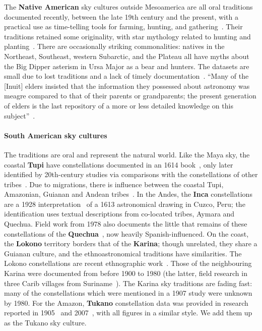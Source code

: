 \documentclass[10pt]{article}
\begin{document}
The {\bf Native American} sky cultures outside Mesoamerica are all oral traditions documented recently, between the late 19th century and the present, with a practical use as time-telling tools for farming, hunting, and gathering~\cite{krupp2013namerica}. Their traditions retained some originality, with star mythology related to hunting and planting~\cite{miller1997stars}. There are occasionally striking commonalities: natives in the Northeast, Southeast, western Subarctic, and the Plateau all have myths about the Big Dipper asterism in Ursa Major as a bear and hunters. The datasets are small due to lost traditions and a lack of timely documentation~\cite{miller1997stars}. ``Many of the [Inuit] elders insisted that the information they possessed about astronomy was meagre compared to that of their parents or grandparents; the present generation of elders is the last repository of a more or less detailed knowledge on this subject''~\cite{macdonald1998arctic}.

\paragraph{South American sky cultures} The traditions are oral and represent the natural world. Like the Maya sky, the coastal {\bf Tupi} have constellations documented in an 1614 book~\cite{abbeville1614histoire}, only later identified by 20th-century studies via comparisons with the constellations of other tribes~\cite{magana1984tupi,afonso2013constelaccoes}. Due to migrations, there is influence between the coastal Tupi, Amazonian, Guianan and Andean tribes~\cite{magana1984tupi}. In the Andes, the {\bf Inca} constellations are a 1928 interpretation~\cite{lehmann1928coricancha} of a 1613 astronomical drawing in Cuzco, Peru; the identification uses textual descriptions from co-located tribes, Aymara and Quechua. Field work from 1978 also documents the little that remains of these constellations of the {\bf Quechua}~\cite{urton1978beasts}, now heavily Spanish-influenced. On the coast, the {\bf Lokono} territory borders that of the {\bf Kari{\textquotesingle}na}; though unrelated, they share a Guianan culture, and the ethnoastronomical traditions have similarities. The Lokono constellations are recent ethnographic work~\cite{rybka2018lokono}. Those of the neighbouring Kari{\textquotesingle}na were documented from before 1900 to 1980 (the latter, field research in three Carib villages from Suriname~\cite{magana1982carib}). The Kari{\textquotesingle}na sky traditions are fading fast: many of the constellations which were mentioned in a 1907 study were unknown by 1980. For the Amazon, {\bf Tukano} constellation data was provided in research reported in 1905~\cite{koch1905anfange} and 2007~\cite{cardoso2007ceu}, with all figures in a similar style. We add them up as the Tukano sky culture.
\end{document}
